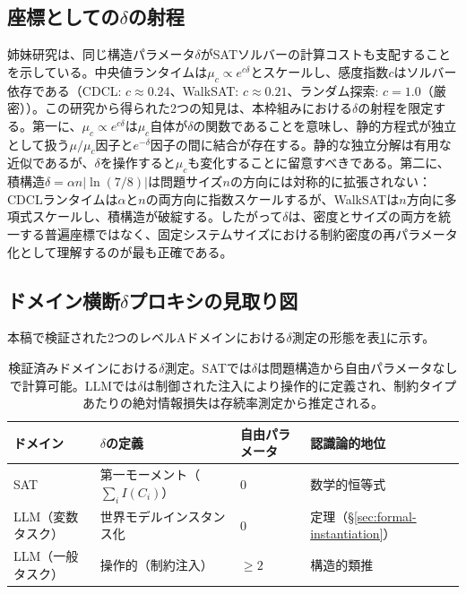 \documentclass[11pt,a4paper]{article}
\begin{document}
\subsection{座標としての\texorpdfstring{$\delta$}{δ}の射程}
\label{sec:delta-scope}

姉妹研究\cite{sunagawa2026sat}は、同じ構造パラメータ$\delta$がSATソルバーの計算コストも支配することを示している。中央値ランタイムは$\mu_c \propto e^{c\delta}$とスケールし、感度指数$c$はソルバー依存である（CDCL: $c \approx 0.24$、WalkSAT: $c \approx 0.21$、ランダム探索: $c = 1.0$（厳密））。この研究から得られた2つの知見は、本枠組みにおける$\delta$の射程を限定する。第一に、$\mu_c \propto e^{c\delta}$は$\mu_c$自体が$\delta$の関数であることを意味し、静的方程式が独立として扱う$\mu/\mu_c$因子と$e^{-\delta}$因子の間に結合が存在する。静的な独立分解は有用な近似であるが、$\delta$を操作すると$\mu_c$も変化することに留意すべきである。第二に、積構造$\delta = \alpha n |\ln(7/8)|$は問題サイズ$n$の方向には対称的に拡張されない：CDCLランタイムは$\alpha$と$n$の両方向に指数スケールするが、WalkSATは$n$方向に多項式スケールし、積構造が破綻する。したがって$\delta$は、密度とサイズの両方を統一する普遍座標ではなく、固定システムサイズにおける制約密度の再パラメータ化として理解するのが最も正確である。

\subsection{ドメイン横断\texorpdfstring{$\delta$}{δ}プロキシの見取り図}

本稿で検証された2つのレベルAドメインにおける$\delta$測定の形態を表\ref{tab:proxy_landscape}に示す。

\begin{table}[ht]
\centering
\small
\begin{tabular}{llll}
\toprule
\textbf{ドメイン} & \textbf{$\delta$の定義} & \textbf{自由パラメータ} & \textbf{認識論的地位} \\
\midrule
SAT & 第一モーメント（$\sum_i I(C_i)$） & 0 & 数学的恒等式 \\
LLM（変数タスク） & 世界モデルインスタンス化 & 0 & 定理（\S\ref{sec:formal-instantiation}） \\
LLM（一般タスク） & 操作的（制約注入） & $\geq 2$ & 構造的類推 \\
\bottomrule
\end{tabular}
\caption{検証済みドメインにおける$\delta$測定。SATでは$\delta$は問題構造から自由パラメータなしで計算可能。LLMでは$\delta$は制御された注入により操作的に定義され、制約タイプあたりの絶対情報損失は存続率測定から推定される。}
\label{tab:proxy_landscape}
\end{table}
\end{document}
